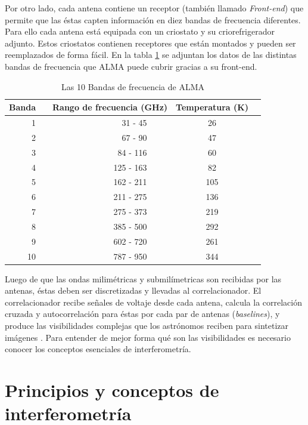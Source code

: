 \clearpage

Por otro lado, cada antena contiene un receptor (también llamado \textit{Front-end}) que permite que las éstas capten información en diez bandas de frecuencia diferentes. Para ello cada antena está equipada con un criostato y su criorefrigerador adjunto. Estos criostatos contienen receptores que están montados y pueden ser reemplazados de forma fácil. En la tabla \ref{tab:bands} se adjuntan los datos de las distintas bandas de frecuencia que ALMA puede cubrir gracias a su front-end.

\newcommand{\ra}[1]{\renewcommand{\arraystretch}{#1}}
\begin{table}[h!]
\centering
\ra{1.2}
\caption{Las 10 Bandas de frecuencia de ALMA}
\label{tab:bands}
\begin{tabular}{@{}rcrrcr@{}} 
\toprule
 \multicolumn{1}{c}{{\bf Banda}} & \phantom{a} & \multicolumn{2}{c}{{\bf Rango de frecuencia (GHz)}}  & \multicolumn{1}{c}{{\bf Temperatura (K)}} \\
 \midrule
 1   && 31 - 45 &&  26\\
 2   && 67 - 90 &&  47\\    
 3  && 84 - 116 &&  60\\
 4  && 125 - 163 &&  82\\
 5  && 162 - 211 &&  105\\
 6  && 211 - 275 &&  136\\
 7  && 275 - 373 &&  219\\
 8  && 385 - 500 &&  292\\
 9  && 602 - 720 &&  261\\
 10  && 787 - 950 &&  344\\
 \toprule
\end{tabular}
\end{table}

Luego de que las ondas milimétricas y submilímetricas son recibidas por las antenas, éstas deben ser discretizadas y llevadas al correlacionador. El correlacionador recibe señales de voltaje desde cada antena, calcula la correlación cruzada y autocorrelación para éstas por cada par de antenas (\textit{baselines}), y produce las visibilidades complejas que los astrónomos reciben para sintetizar imágenes \citep{alma-handbook}. Para entender de mejor forma qué son las visibilidades es necesario conocer los conceptos esenciales de interferometría.

\section{Principios y conceptos de interferometría}

